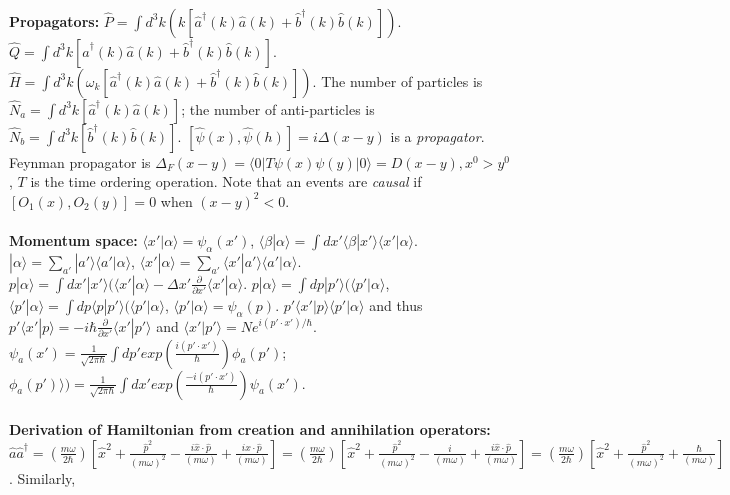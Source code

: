 \\
{\bf Propagators:}
$\hat{P}= \int d^3k (k[\hat{a}^{\dagger}(k) \hat{a}(k) + \hat{b}^{\dagger}(k) \hat{b}(k)])$.
$\hat{Q}= \int d^3k [\hat{a}^{\dagger}(k) \hat{a}(k) + \hat{b}^{\dagger}(k) \hat{b}(k)]$.
$\hat{H}= \int d^3k (\omega_k [\hat{a}^{\dagger}(k) \hat{a}(k) + \hat{b}^{\dagger}(k) \hat{b}(k)])$.
The number of particles is $\hat{N}_a= \int d^3k [\hat{a}^{\dagger}(k) \hat{a}(k)]$;
the number of anti-particles is $\hat{N}_b= \int d^3k [\hat{b}^{\dagger}(k) \hat{b}(k)]$.
$[\hat{\psi}(x), \hat{\psi}(h)]= i \Delta(x-y)$ is a \emph{propagator}.  Feynman propagator is
$\Delta_F(x-y)= \langle 0 | T \psi(x) \psi(y) | 0 \rangle = D(x-y), x^0>y^0$, $T$ is the time ordering operation.
Note that an events are \emph{causal} if $[O_1(x), O_2(y)]=0$ when $(x-y)^2<0$.
\\
\\
{\bf Momentum space:}
$\langle x' | \alpha \rangle= \psi_{\alpha}(x')$, $\langle \beta | \alpha \rangle= \int dx' \langle \beta | x' \rangle
\langle x' | \alpha \rangle$.  
$| \alpha \rangle = \sum_{a'}  |a'\rangle \langle a' | \alpha\rangle$,
$\langle x'| \alpha \rangle = \sum_{a'}  \langle x'|a'\rangle \langle a' | \alpha\rangle$.
$p | \alpha \rangle = \int dx' | x' \rangle (\langle x' | \alpha \rangle - 
\Delta x' {\frac {\partial} {\partial x'}} \langle x' | \alpha \rangle$.
$p | \alpha \rangle = \int dp | p' \rangle (\langle p' | \alpha \rangle$,
$\langle p' | \alpha \rangle = \int dp \langle p | p' \rangle (\langle p' | \alpha \rangle$, $\langle p' | \alpha \rangle=
\psi_{\alpha}(p)$.  $p' \langle x' |p \rangle \langle p' | \alpha \rangle$ and thus
$p' \langle x' | p \rangle = - i \hbar {\frac {\partial} {\partial x'}} \langle x' | p' \rangle$
and $\langle x' | p' \rangle = N e^{i (p' \cdot x')/ \hbar}$.
$\psi_{a}(x')= {\frac 1 {\sqrt {2 \pi \hbar}}} \int dp' exp({\frac {i (p' \cdot x')} {\hbar}}) \phi_{a}(p')$;
$\phi_{a}(p') \rangle)= {\frac 1 {\sqrt {2 \pi \hbar}}} \int dx' exp({\frac {-i (p' \cdot x')} {\hbar}}) \psi_{a}(x')$.
\\
\\
{\bf Derivation of Hamiltonian from creation and annihilation operators:}
$\hat{a} \hat{a}^{\dagger}= ( {\frac {m \omega}{2 \hbar}}) [ \hat{x}^2 + {\frac {\hat{p}^2} {(m \omega)^2}}
- {\frac {i \hat{x} \cdot \hat{p}} {(m \omega)}} + {\frac {i \hat{x} \cdot \hat{p}} {(m \omega)}} ] =
({\frac {m \omega}{2 \hbar}}) [ \hat{x}^2 + {\frac {\hat{p}^2} {(m \omega)^2}}
- {\frac {i} {(m \omega)}} + {\frac {i \hat{x} \cdot \hat{p}} {(m \omega)}} ] =
({\frac {m \omega}{2 \hbar}}) [ \hat{x}^2 + {\frac {\hat{p}^2} {(m \omega)^2}} + {\frac {\hbar} {(m \omega)}} ]$.  Similarly,
